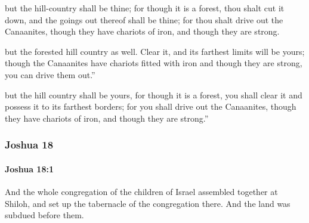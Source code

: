 			\begin{versebox}
					\item[BHS] 
					\item[ASV] but the hill-country shall be thine; for though it is a forest, thou shalt cut it down, and the goings out thereof shall be thine; for thou shalt drive out the Canaanites, though they have chariots of iron, and though they are strong.
					\item[NIV] but the forested hill country as well. Clear it, and its farthest limits will be yours; though the Canaanites have chariots fitted with iron and though they are strong, you can drive them out.”
					\item[NRSV] but the hill country shall be yours, for though it is a forest, you shall clear it and possess it to its farthest borders; for you shall drive out the Canaanites, though they have chariots of iron, and though they are strong.”
			\end{versebox}
	\subsubsection{Joshua 18} %
		\label{JOSHUA-18}

		\paragraph{Joshua 18:1} %
			\label{JOSHUA-18-1}

			And the whole congregation of the children of Israel assembled together at Shiloh, and set up the tabernacle of the congregation there. And the land was subdued before them.

